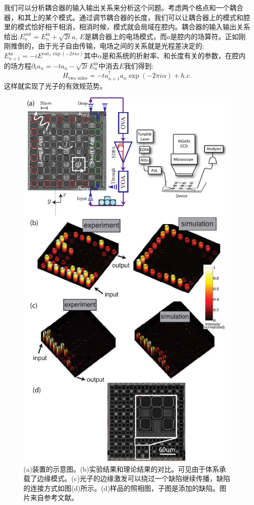 \documentclass[supercite]{HustGraduPaper}
\begin{document}
我们可以分析耦合器的输入输出关系来分析这个问题。考虑两个格点和一个耦合器，和其上的某个模式。通过调节耦合器的长度，我们可以让耦合器上的模式和腔里的模式恰好相干相消，相消时候，模式就会局域在腔内。耦合器的输入输出关系给出:$E_n^{\text{out}} = E_n^{\text{in}} + \sqrt{2t} a$, $E$是耦合器上的电场模式，而$a$是腔内的场算符。正如刚刚推倒的，由于光子自由传输，电场之间的关系就是光程差决定的:
$E_{n+1}^\text{in} = -i E^{\text{out}_x \exp(-2\pi i \alpha)}$其中$\alpha$是和系统的折射率、和长度有关的参数，在腔内的场方程$\partial_t a_n = - t a_n - \sqrt{2t} E_n^{\text{in}}$中消去$E$我们得到:
\begin{equation}
	H_{\text{two sides}} = -t a^\dagger_{n+1} a_n \exp(-2\pi i \alpha) + h.c.
\end{equation}
这样就实现了光子的有效规范势。
\begin{figure}
	\centering
	\includegraphics[width=0.8\linewidth]{Figures/topphoto/MH_imaging}
	\caption{(a)装置的示意图。(b)实验结果和理论结果的对比。可见由于体系承载了边缘模式。(c)光子的边缘激发可以绕过一个缺陷继续传播，缺陷的连接方式如图(d)所示。(d)样品的照相图，子图是添加的缺陷。图片来自参考文献\cite{hafezi2013imaging}。}
	\label{fig:mhimaging}
\end{figure}
\end{document}
